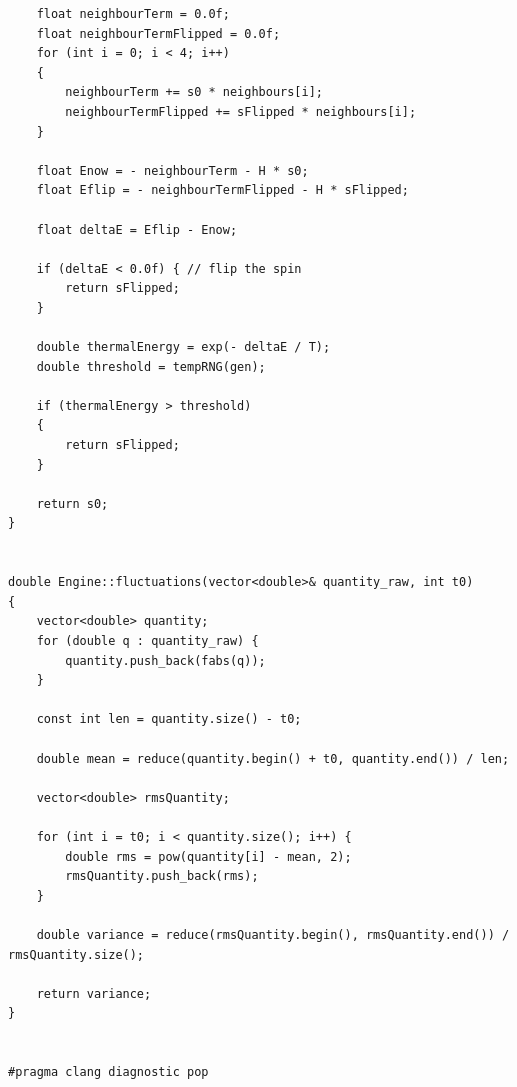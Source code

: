 \documentclass[a4paper, 12pt]{article}
\begin{document}
\begin{lstlisting}
    float neighbourTerm = 0.0f;
    float neighbourTermFlipped = 0.0f;
    for (int i = 0; i < 4; i++)
    {
        neighbourTerm += s0 * neighbours[i];
        neighbourTermFlipped += sFlipped * neighbours[i];
    }

    float Enow = - neighbourTerm - H * s0;
    float Eflip = - neighbourTermFlipped - H * sFlipped;

    float deltaE = Eflip - Enow;

    if (deltaE < 0.0f) { // flip the spin
        return sFlipped;
    }

    double thermalEnergy = exp(- deltaE / T);
    double threshold = tempRNG(gen);

    if (thermalEnergy > threshold)
    {
        return sFlipped;
    }

    return s0;
}


double Engine::fluctuations(vector<double>& quantity_raw, int t0)
{
    vector<double> quantity;
    for (double q : quantity_raw) {
        quantity.push_back(fabs(q));
    }

    const int len = quantity.size() - t0;

    double mean = reduce(quantity.begin() + t0, quantity.end()) / len;

    vector<double> rmsQuantity;

    for (int i = t0; i < quantity.size(); i++) {
        double rms = pow(quantity[i] - mean, 2);
        rmsQuantity.push_back(rms);
    }

    double variance = reduce(rmsQuantity.begin(), rmsQuantity.end()) / rmsQuantity.size();

    return variance;
}


#pragma clang diagnostic pop
\end{lstlisting}



\newpage
\end{document}
